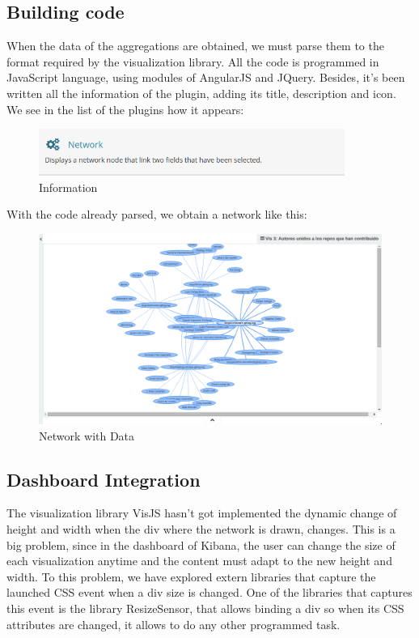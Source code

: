 \documentclass[a4paper, 12pt]{book}
\begin{document}
\subsection{Building code}

When the data of the aggregations are obtained, we must parse them to the format required by the visualization library. All the code is programmed in JavaScript language, using modules of AngularJS and JQuery. Besides, it’s been written all the information of the plugin, adding its title, description and icon. We see in the list of the plugins how it appears:

\begin{figure}[H]
  \centering
  \includegraphics[width=10cm, keepaspectratio]{img/development/networkinformation}
  \caption{Information}
  \label{fig:networkinformation}
\end{figure}

With the code already parsed, we obtain a network like this:

\begin{figure}[H]
  \centering
  \includegraphics[width=16cm, keepaspectratio]{img/development/visualizationwithdata}
  \caption{Network with Data}
  \label{fig:visualizationwithdata}
\end{figure}

\subsection{Dashboard Integration}
\label{sec:dashboardintegration}

The visualization library VisJS hasn’t got implemented the dynamic change of height and width when the div where the network is drawn, changes. This is a big problem, since in the dashboard of Kibana, the user can change the size of each visualization anytime and the content must adapt to the new height and width.
To this problem, we have explored extern libraries that capture the launched CSS event when a div size is changed. One of the libraries that captures this event is the library ResizeSensor, that allows binding a div so when its CSS attributes are changed, it allows to do any other programmed task.
\end{document}
